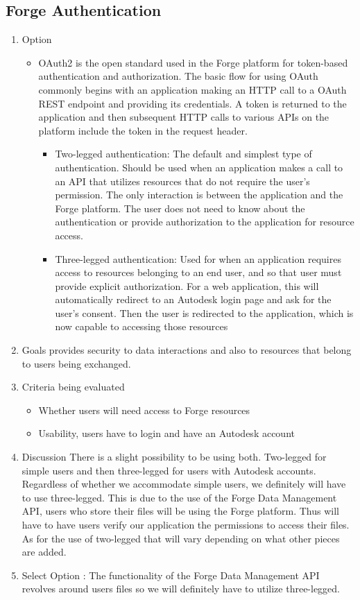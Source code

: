 \documentclass[letterpaper, 10pt, draftclsnofoot, compsoc, onecolumn]{IEEEtran}
\begin{document}
	\subsection{Forge Authentication}
		\begin{enumerate}
			\item{Option}
				\begin{itemize}
					\item OAuth2 is the open standard used in the Forge platform for token-based authentication and authorization. The basic flow for using OAuth commonly begins with an application making an HTTP call to a OAuth REST endpoint and providing its credentials. A token is returned to the application and then subsequent HTTP calls to various APIs on the platform include the token in the request header.
					\begin{itemize}
						\item Two-legged authentication: The default and simplest type of authentication. Should be used when an application makes a call to an API that utilizes resources that do not require the user's permission. The only interaction is between the application and the Forge platform. The user does not need to know about the authentication or provide authorization to the application for resource access.
						\item Three-legged authentication: Used for when an application requires access to resources belonging to an end user, and so that user must provide explicit authorization. For a web application, this will automatically redirect to an Autodesk login page and ask for the user's consent. Then the user is redirected to the application, which is now capable to accessing those resources
					\end{itemize}
				\end{itemize}
			\item{Goals} provides security to data interactions and also to resources that belong to users being exchanged.
			\item{Criteria being evaluated}
				\begin{itemize}
					\item{Whether users will need access to Forge resources}
					\item{Usability, users have to login and have an Autodesk account}
				\end{itemize}
			\item{Discussion} There is a slight possibility to be using both. Two-legged for simple users and then three-legged for users with Autodesk accounts. Regardless of whether we accommodate simple users, we definitely will have to use three-legged. This is due to the use of the Forge Data Management API, users who store their files will be using the Forge platform. Thus will have to have users verify our application the permissions to access their files. As for the use of two-legged that will vary depending on what other pieces are added.
			\item{Select Option} : The functionality of the Forge Data Management API revolves around users files so we will definitely have to utilize three-legged.
		\end{enumerate}
\end{document}
